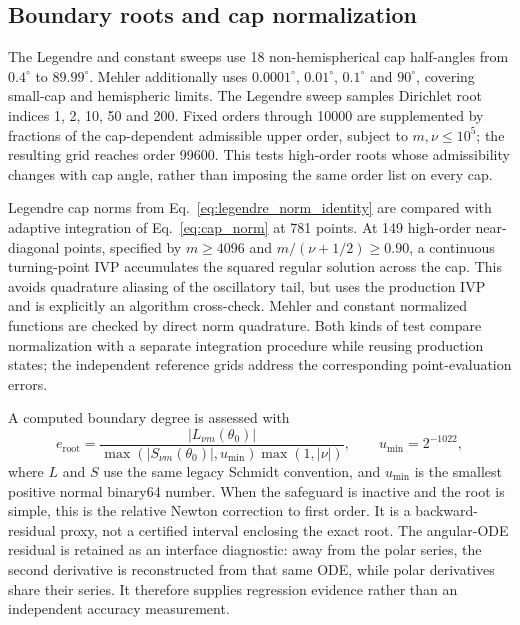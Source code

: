 ﻿\documentclass[11pt,a4paper]{article}
\newcommand{\abs}[1]{\left|#1\right|}
\begin{document}
\subsection{Boundary roots and cap normalization}
\label{sec:cap_protocol}

The Legendre and constant sweeps use 18 non-hemispherical cap half-angles from $0.4^\circ$ to $89.99^\circ$. Mehler additionally uses $0.0001^\circ$, $0.01^\circ$, $0.1^\circ$ and $90^\circ$, covering small-cap and hemispheric limits. The Legendre sweep samples Dirichlet root indices 1, 2, 10, 50 and 200. Fixed orders through 10000 are supplemented by fractions of the cap-dependent admissible upper order, subject to $m,\nu\leq10^5$; the resulting grid reaches order 99600. This tests high-order roots whose admissibility changes with cap angle, rather than imposing the same order list on every cap.

Legendre cap norms from Eq.~\eqref{eq:legendre_norm_identity} are compared with adaptive integration of Eq.~\eqref{eq:cap_norm} at 781 points. At 149 high-order near-diagonal points, specified by $m\geq4096$ and $m/(\nu+1/2)\geq0.90$, a continuous turning-point IVP accumulates the squared regular solution across the cap. This avoids quadrature aliasing of the oscillatory tail, but uses the production IVP and is explicitly an algorithm cross-check. Mehler and constant normalized functions are checked by direct norm quadrature. Both kinds of test compare normalization with a separate integration procedure while reusing production states; the independent reference grids address the corresponding point-evaluation errors.

A computed boundary degree is assessed with
\begin{equation}
 e_{\mathrm{root}}=\frac{\abs{L_{\nu m}(\theta_0)}}
 {\max\!\left(\abs{S_{\nu m}(\theta_0)},u_{\min}\right)
  \max(1,\abs{\nu})},
 \qquad u_{\min}=2^{-1022},
 \label{eq:root_backward_error}
\end{equation}
where $L$ and $S$ use the same legacy Schmidt convention, and $u_{\min}$ is the smallest positive normal binary64 number. When the safeguard is inactive and the root is simple, this is the relative Newton correction to first order. It is a backward-residual proxy, not a certified interval enclosing the exact root. The angular-ODE residual is retained as an interface diagnostic: away from the polar series, the second derivative is reconstructed from that same ODE, while polar derivatives share their series. It therefore supplies regression evidence rather than an independent accuracy measurement.
\end{document}
